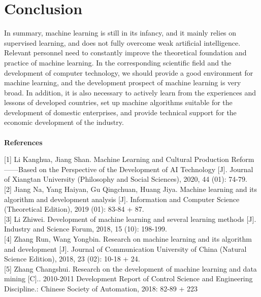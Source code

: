\documentclass{article}
\begin{document}
\section{Conclusion}
In summary, machine learning is still in its infancy, and it mainly relies on supervised learning, and 
does not fully overcome weak artificial intelligence. Relevant personnel need to constantly improve 
the theoretical foundation and practice of machine learning. In the corresponding scientific field and 
the development of computer technology, we should provide a good environment for machine learning, 
and the development prospect of machine learning is very broad. In addition, it is also necessary to 
actively learn from the experiences and lessons of developed countries, set up machine algorithms 
suitable for the development of domestic enterprises, and provide technical support for the economic 
development of the industry.
\\\\

\textbf{References}

[1] Li Kanghua, Jiang Shan. Machine Learning and Cultural Production Reform——Based on the 
       Perspective of the Development of AI Technology [J]. Journal of Xiangtan University 
       (Philosophy and Social Sciences), 2020, 44 (01): 74-79.
\\

 [2] Jiang Na, Yang Haiyan, Gu Qingchuan, Huang Jiya. Machine learning and its algorithm and 
      development analysis [J]. Information and Computer Science (Theoretical Edition), 2019
      (01): 83-84 + 87.
\\ 

   [3] Li Zhiwei. Development of machine learning and several learning methods [J]. Industry and 
     Science Forum, 2018, 15 (10): 198-199.
     \\ 
     
     [4] Zhang Run, Wang Yongbin. Research on machine learning and its algorithm and development [J]. 
    Journal of Communication University of China (Natural Science Edition), 2018, 23 (02): 
      10-18 + 24.
      \\
      
    [5] Zhang Changshui. Research on the development of machine learning and data mining [C].. 
    2010-2011 Development Report of Control Science and Engineering Discipline.: Chinese 
    Society of Automation, 2018: 82-89 + 223
\end{document}
